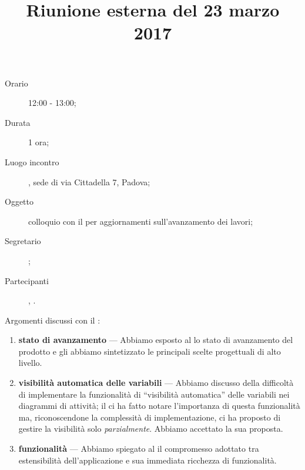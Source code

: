 


\author{\LS}
\supervisor{\GG}
\title{Riunione esterna del 23 marzo 2017}



\maketitle

\begin{description}
	\item[Orario] 12:00 - 13:00;
	\item[Durata] 1 ora;
	\item[Luogo incontro] \ZU, sede di via Cittadella 7, Padova;
	\item[Oggetto] colloquio con il \GP{} per aggiornamenti sull'avanzamento dei lavori;
	\item[Segretario] \LS; 
	\item[Partecipanti] \GP, \ALL.
\end{description}

Argomenti discussi con il \GP:
\begin{enumerate}
	\item \textbf{stato di avanzamento} --- Abbiamo esposto al \GP{} lo stato di avanzamento del prodotto e gli abbiamo sintetizzato le principali scelte progettuali di alto livello.
	\item \textbf{visibilità automatica delle variabili} --- Abbiamo discusso della difficoltà di implementare la funzionalità di “visibilità automatica” delle variabili nei diagrammi di attività; il \GP{} ci ha fatto notare l'importanza di questa funzionalità ma, riconoscendone la complessità di implementazione, ci ha proposto di gestire la visibilità solo \emph{parzialmente}. Abbiamo accettato la sua proposta.
	\item \textbf{funzionalità} --- Abbiamo spiegato al \GP{} il compromesso adottato tra estensibilità dell'applicazione e sua immediata ricchezza di funzionalità.
\end{enumerate}


